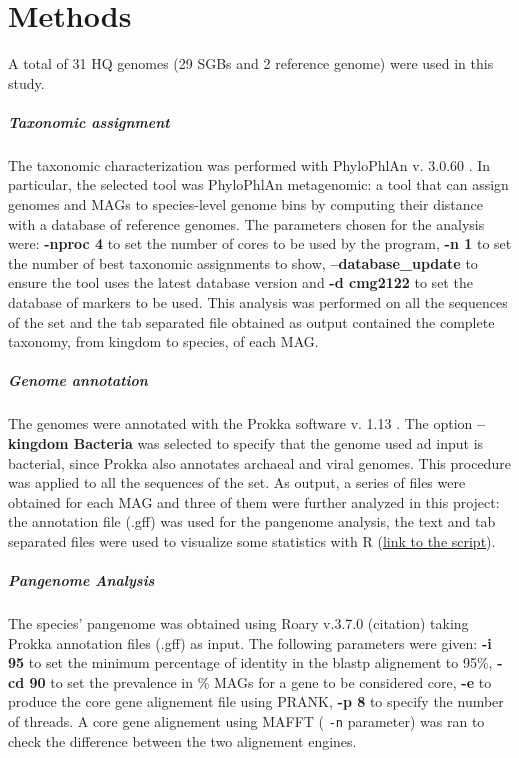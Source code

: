 \section*{Methods}



A total of 31 HQ genomes (29 SGBs and 2 reference genome) were used in this study.

\nocite{Tange2011a}

\subparagraph*{Taxonomic assignment}

The taxonomic characterization was performed with PhyloPhlAn v. 3.0.60 \cite{phylophlan}. In particular, the selected tool was PhyloPhlAn metagenomic: a tool that can assign genomes and MAGs to species-level genome bins by computing their distance with a database of reference genomes. The parameters chosen for the analysis were: \textbf{-nproc 4} to set the number of cores to be used by the program, \textbf{-n 1} to set the number of best taxonomic assignments to show, \textbf{--database\_update} to ensure the tool uses the latest database version and \textbf{-d cmg2122} to set the database of markers to be used. This analysis was performed on all the sequences of the set and the tab separated file obtained as output contained the complete taxonomy, from kingdom to species, of each MAG.

\subparagraph*{Genome annotation}

The genomes were annotated with the Prokka software v. 1.13 \cite{prokka}. The option \textbf{--kingdom Bacteria} was selected to specify that the genome used ad input is bacterial, since Prokka also annotates archaeal and viral genomes. This procedure was applied to all the sequences of the set. As output, a series of files were obtained for each MAG and three of them were further analyzed in this project: the annotation file (.gff) was used for the pangenome analysis, the text and tab separated files were used to visualize some statistics with R (\href{https://github.com/enricofrigoli/cmg_project/blob/main/Rscript/CMG_Rscript.md}{link to the script}).


\subparagraph*{Pangenome Analysis}

The species' pangenome was obtained using Roary v.3.7.0 (citation) taking Prokka annotation files (.gff) as input. 
The following parameters were given: \textbf{-i 95} to set the minimum percentage of identity
in the blastp alignement to 95\%, \textbf{-cd 90} to set the prevalence in \% MAGs for a gene
to be considered core, \textbf{-e} to produce the core gene alignement file using PRANK, \textbf{-p 8} to
specify the number of threads. A core gene alignement using MAFFT ( \texttt{-n} parameter) was ran to check
the difference between the two alignement engines.

